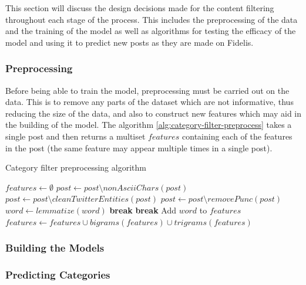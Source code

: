 This section will discuss the design decisions made for the content filtering throughout each stage of the process. This includes the preprocessing of the data and the training of the model as well as algorithms for testing the efficacy of the model and using it to predict new posts as they are made on Fidelis.

\subsubsection{Preprocessing}
Before being able to train the model, preprocessing must be carried out on the data. This is to remove any parts of the dataset which are not informative, thus reducing the size of the data, and also to construct new features which may aid in the building of the model. The algorithm \ref{alg:category-filter-preprocess} takes a single post and then returns a multiset $features$ containing each of the features in the post (the same feature may appear multiple times in a single post). 

\begin{algorithm}
\caption{Category filter preprocessing algorithm}
\label{alg:category-filter-preprocess}
\begin{algorithmic}[1]
	\State $features\gets \emptyset$
	\State $post\gets post\setminus nonAsciiChars(post)$ 
	\State $post\gets post\setminus cleanTwitterEntities(post)$
	\State $post\gets post\setminus removePunc(post)$
		\State $word\gets lemmatize(word)$
			\State \textbf{break} 
		\EndIf
			\State \textbf{break} 
		\EndIf
		\State Add $word$ to $features$
	\EndFor
	\State $features\gets features\cup bigrams(features)\cup trigrams(features)$
	\State {}
\EndFunction
\end{algorithmic}
\end{algorithm}

\subsubsection{Building the Models}


\subsubsection{Predicting Categories}


